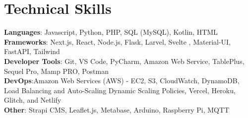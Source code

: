 \documentclass[letterpaper,11pt]{article}
\begin{document}
%
\section{Technical Skills}
 \begin{itemize}[leftmargin=0.15in, label={}]
    \small{\item{
     \textbf{Languages}{: Javascript, Python, PHP, SQL (MySQL), Kotlin, HTML} \\
     \textbf{Frameworks}{: Next.js, React, Node.js, Flask, Larvel, Svelte , Material-UI, FastAPI, Tailwind} \\
     \textbf{Developer Tools}{: Git, VS Code,  PyCharm, Amazon Web Service, TablePlus, Sequel Pro, Mamp PRO, Postman} \\
      \textbf{DevOps}{:Amazon Web Services (AWS) - EC2, S3, CloudWatch, DynamoDB, Load Balancing and Auto-Scaling Dynamic Scaling Policies, Vercel, Heroku, Glitch, and Netlify } \\
     \textbf{Other}{: Strapi CMS, Leaflet.js, Metabase, Arduino, Raspberry Pi, MQTT}
    }}
 \end{itemize}


\end{document}

